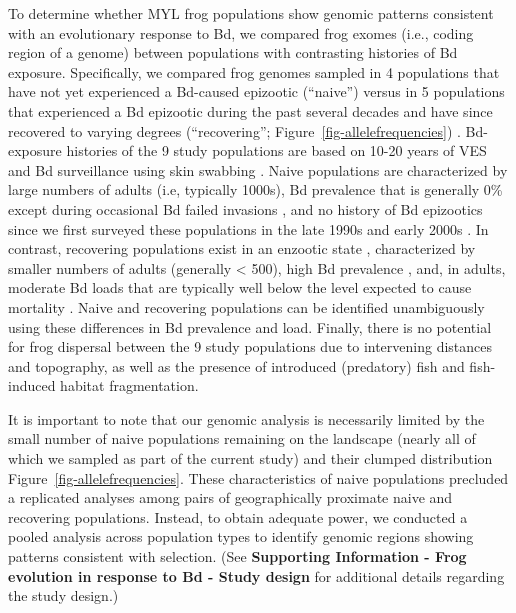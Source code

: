 \documentclass[9pt,twocolumn,twoside,lineno]{pnas-new}
\begin{document}
To determine whether MYL frog populations show genomic patterns
consistent with an evolutionary response to Bd, we compared frog exomes
(i.e., coding region of a genome) between populations with contrasting
histories of Bd exposure. Specifically, we compared frog genomes sampled
in 4 populations that have not yet experienced a Bd-caused epizootic
(``naive'') \citep{zhou2015} versus in 5 populations that experienced a
Bd epizootic during the past several decades and have since recovered to
varying degrees (``recovering''; Figure~\ref{fig-allelefrequencies})
\citep{knapp2016, vredenburg2010}. Bd-exposure histories of the 9 study
populations are based on 10-20 years of VES and Bd surveillance using
skin swabbing \citep[e.g.,][]{knapp2016, zhou2015, wilber2022}. Naive
populations are characterized by large numbers of adults (i.e, typically
1000s), Bd prevalence that is generally 0\% except during occasional Bd
failed invasions \citep[during which Bd loads remain very
low,][]{wilber2022}, and no history of Bd epizootics since we first
surveyed these populations in the late 1990s and early 2000s
\citep{zhou2015}. In contrast, recovering populations exist in an
enzootic state \citep{briggs2010}, characterized by smaller numbers of
adults (generally \textless{} 500), high Bd prevalence \citep[often
\textgreater{} 80\%,][]{knapp2011}, and, in adults, moderate Bd loads
that are typically well below the level expected to cause mortality
\citep{vredenburg2010}. Naive and recovering populations can be
identified unambiguously using these differences in Bd prevalence and
load. Finally, there is no potential for frog dispersal between the 9
study populations due to intervening distances and topography, as well
as the presence of introduced (predatory) fish and fish-induced habitat
fragmentation.

It is important to note that our genomic analysis is necessarily limited
by the small number of naive populations remaining on the landscape
(nearly all of which we sampled as part of the current study) and their
clumped distribution Figure~\ref{fig-allelefrequencies}. These
characteristics of naive populations precluded a replicated analyses
among pairs of geographically proximate naive and recovering
populations. Instead, to obtain adequate power, we conducted a pooled
analysis across population types to identify genomic regions showing
patterns consistent with selection. (See \textbf{Supporting Information
- Frog evolution in response to Bd - Study design} for additional
details regarding the study design.)
\end{document}
